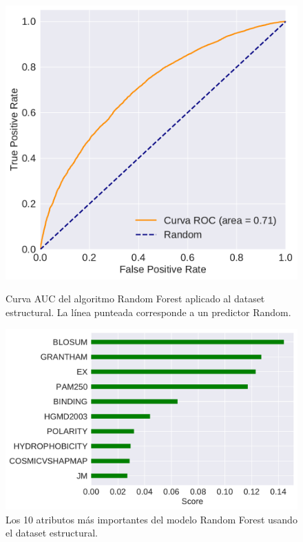 \begin{figure}
\centering
\begin{minipage}[b]{0.8\textwidth}
    \centering
    \includegraphics[width=\textwidth]{documents/latex/figures/3/auc_structural.pdf}
    \caption{Curva AUC del algoritmo Random Forest aplicado al dataset estructural. La línea punteada corresponde a un predictor Random.}
    \label{fig:auc_structural}
\end{minipage}

\hfill
\hfill

\begin{minipage}[b]{\textwidth}
    \centering
    \includegraphics[width=\textwidth]{documents/latex/figures/3/importances_structural.pdf}
    \caption{Los 10 atributos más importantes del modelo Random Forest usando el dataset estructural.}
    \label{fig:importances_structural}
\end{minipage}

\end{figure}


